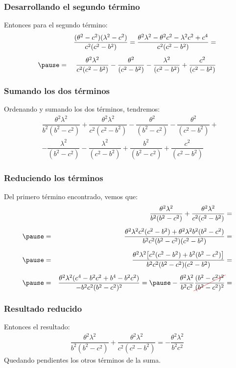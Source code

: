 \documentclass[12pt]{beamer}
\newcommand{\Cancel}[2][black]{{\color{#1}\cancel{\color{black}#2}}}
\begin{document}
\begin{frame}
\frametitle{Desarrollando el segundo término}
Entonces para el segundo término:
\pause
\begin{eqnarray*}
&{}&\dfrac{(\theta^{2} - c^{2})(\lambda^{2} - c^{2})}{c^{2}(c^{2} - b^{2})} = \dfrac{\theta^{2} \lambda^{2} - \theta^2 c^{2} - \lambda^{2} c^{2} + c^{4}}{c^{2}(c^{2} - b^{2})} = \\[0.5em] \pause
&=& \dfrac{\theta^{2} \lambda^{2}}{c^{2}(c^{2} - b^{2})} - \dfrac{\theta^{2}}{(c^{2} - b^{2})} - \dfrac{\lambda^{2}}{(c^{2} - b^{2})} + \dfrac{c^{2}}{(c^{2} - b^{2})}
\end{eqnarray*}
\end{frame}
\begin{frame}
\frametitle{Sumando los dos términos}
Ordenando y sumando los dos términos, tendremos:
\pause
\begin{align*}
&\dfrac{\theta^{2} \lambda^{2}}{b^{2}(b^{2} - c^{2})} + \dfrac{\theta^{2} \lambda^{2}}{c^{2}(c^{2} - b^{2})} - \dfrac{\theta^{2}}{(b^{2} - c^{2})} - \dfrac{\theta^{2}}{(c^{2} - b^{2})} + \\[0.5em] 
&- \dfrac{\lambda^{2}}{(b^{2} - c^{2})} - \dfrac{\lambda^{2}}{(c^{2} - b^{2})} + \dfrac{b^{2}}{(b^{2} - c^{2})} + \dfrac{c^{2}}{(c^{2} - b^{2})}
\end{align*}
\end{frame}
\begin{frame}
\frametitle{Reduciendo los términos}
Del primero término encontrado, vemos que:
\pause
\begin{eqnarray*}
&{}&\dfrac{\theta^{2} \lambda^{2}}{b^{2}(b^{2} - c^{2})} + \dfrac{\theta^{2} \lambda^{2}}{c^{2}(c^{2} - b^{2})} = \\[0.5em] \pause
&=& \dfrac{\theta^{2} \lambda^{2} c^{2} (c^{2} - b^{2}) + \theta^{2} \lambda^{2} b^{2} (b^{2} - c^{2})}{b^{2} c^{2}(b^{2} - c^{2})(c^{2} - b^{2})} = \\[0.5em] \pause
&=& \dfrac{\theta^{2} \lambda^{2} \big[ c^{2} (c^{2} - b^{2}) + b^{2} (b^{2} - c^{2}) \big]}{b^{2} c^{2}(b^{2} - c^{2})(c^{2} - b^{2})} = \\[0.5em] \pause
&=& \dfrac{\theta^{2} \lambda^{2} (c^{4} - b^{2} c^{2} + b^{4} -b^{2} c^{2})}{-b^{2} c^{2} (b^{2} - c^{2})^{2}} = \pause - \dfrac{\theta^{2} \lambda^{2}}{b^{2} c^{2}} \Cancel[red]{\dfrac{(b^{2} - c^{2})^{2}}{(b^{2} - c^{2})^{2}}} =
\end{eqnarray*}
\end{frame}
\begin{frame}
\frametitle{Resultado reducido}
Entonces el resultado:
\pause
\begin{align*}
\dfrac{\theta^{2} \lambda^{2}}{b^{2}(b^{2} - c^{2})} + \dfrac{\theta^{2} \lambda^{2}}{c^{2}(c^{2} - b^{2})} = - \dfrac{\theta^{2} \lambda^{2}}{b^{2} c^{2}}
\end{align*}
\pause
Quedando pendientes los otros términos de la suma.
\end{frame}
\end{document}

